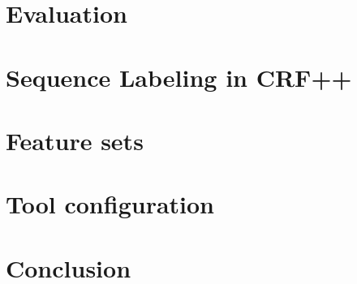 \documentclass[a4paper,8pt,oneside]{article}
\begin{document}
\section{Evaluation}

\section{Sequence Labeling in CRF++}

\section{Feature sets}

\section{Tool configuration}

\section{Conclusion}

% 
% 
\end{document}
